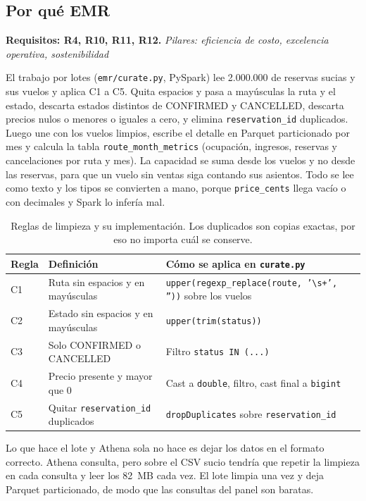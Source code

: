 \documentclass[11pt,letterpaper]{article}
\newcommand{\trazo}[2]{\par\smallskip\noindent\textbf{#1.} \textit{#2}\par\smallskip}
\begin{document}
\subsection{Por qué EMR}
\trazo{Requisitos: R4, R10, R11, R12}{Pilares: eficiencia de costo, excelencia operativa, sostenibilidad}
El trabajo por lotes (\texttt{emr/curate.py}, PySpark) lee 2.000.000 de reservas sucias y sus vuelos y aplica C1 a C5. Quita espacios y pasa a mayúsculas la ruta y el estado, descarta estados distintos de CONFIRMED y CANCELLED, descarta precios nulos o menores o iguales a cero, y elimina \texttt{reservation\_id} duplicados. Luego une con los vuelos limpios, escribe el detalle en Parquet particionado por mes y calcula la tabla \texttt{route\_month\_metrics} (ocupación, ingresos, reservas y cancelaciones por ruta y mes). La capacidad se suma desde los vuelos y no desde las reservas, para que un vuelo sin ventas siga contando sus asientos. Todo se lee como texto y los tipos se convierten a mano, porque \texttt{price\_cents} llega vacío o con decimales y Spark lo infería mal.

\begin{table}[H]
\centering
\begin{tabular}{C{0.9cm} L{7.2cm} L{6.5cm}}
\toprule
\textbf{Regla} & \textbf{Definición} & \textbf{Cómo se aplica en \texttt{curate.py}} \\
\midrule
C1 & Ruta sin espacios y en mayúsculas & \texttt{upper(regexp\_replace(route, '\textbackslash s+', ''))} sobre los vuelos \\
C2 & Estado sin espacios y en mayúsculas & \texttt{upper(trim(status))} \\
C3 & Solo CONFIRMED o CANCELLED & Filtro \texttt{status IN (...)} \\
C4 & Precio presente y mayor que 0 & Cast a \texttt{double}, filtro, cast final a \texttt{bigint} \\
C5 & Quitar \texttt{reservation\_id} duplicados & \texttt{dropDuplicates} sobre \texttt{reservation\_id} \\
\bottomrule
\end{tabular}
\caption{Reglas de limpieza y su implementación. Los duplicados son copias exactas, por eso no importa cuál se conserve.}
\end{table}

Lo que hace el lote y Athena sola no hace es dejar los datos en el formato correcto. Athena consulta, pero sobre el CSV sucio tendría que repetir la limpieza en cada consulta y leer los 82~MB cada vez. El lote limpia una vez y deja Parquet particionado, de modo que las consultas del panel son baratas.
\end{document}
